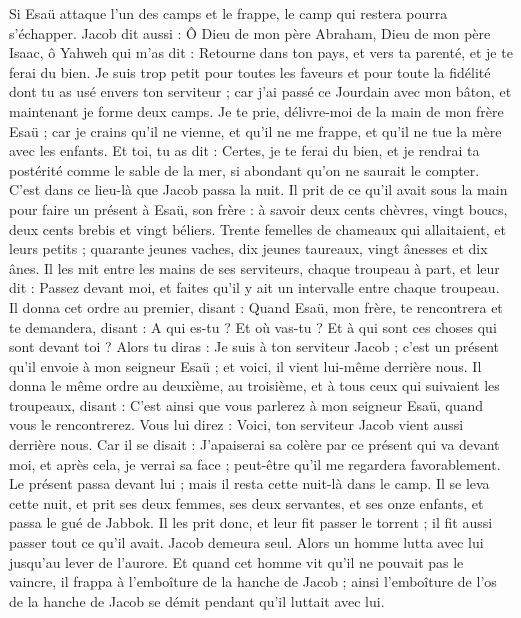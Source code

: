 \begin{multicols}{2}
Si Esaü attaque l'un des camps et le frappe, le camp qui restera pourra s’échapper.
Jacob dit aussi : Ô Dieu de mon père Abraham, Dieu de mon père Isaac, ô Yahweh qui m'as dit : Retourne dans ton pays, et vers ta parenté, et je te ferai du bien.
Je suis trop petit pour toutes les faveurs et pour toute la fidélité dont tu as usé envers ton serviteur ; car j'ai passé ce Jourdain avec mon bâton, et maintenant je forme deux camps.
Je te prie, délivre-moi de la main de mon frère Esaü ; car je crains qu'il ne vienne, et qu'il ne me frappe, et qu'il ne tue la mère avec les enfants.
Et toi, tu as dit : Certes, je te ferai du bien, et je rendrai ta postérité comme le sable de la mer, si abondant qu’on ne saurait le compter.
C’est dans ce lieu-là que Jacob passa la nuit.  Il prit de ce qu’il avait sous la main pour faire un présent à Esaü, son frère :
à savoir deux cents chèvres, vingt boucs, deux cents brebis et vingt béliers.
Trente femelles de chameaux qui allaitaient, et leurs petits ; quarante jeunes vaches, dix jeunes taureaux, vingt ânesses et dix ânes.
Il les mit entre les mains de ses serviteurs, chaque troupeau à part, et leur dit : Passez devant moi, et faites qu'il y ait un intervalle entre chaque troupeau.
Il donna cet ordre au premier, disant : Quand Esaü, mon frère, te rencontrera et te demandera, disant : A qui es-tu ? Et où vas-tu ? Et à qui sont ces choses qui sont devant toi ?
Alors tu diras : Je suis à ton serviteur Jacob ; c'est un présent qu'il envoie à mon seigneur Esaü ; et voici, il vient lui-même derrière nous.
Il donna le même ordre au deuxième, au troisième, et à tous ceux qui suivaient les troupeaux, disant : C’est ainsi que vous parlerez à mon seigneur Esaü, quand vous le rencontrerez.
Vous lui direz : Voici, ton serviteur Jacob vient aussi derrière nous. Car il se disait : J'apaiserai sa colère par ce présent qui va devant moi, et après cela, je verrai sa face ; peut-être qu'il me regardera favorablement.
Le présent passa devant lui ; mais il resta cette nuit-là dans le camp.
Il se leva cette nuit, et prit ses deux femmes, ses deux servantes, et ses onze enfants, et passa le gué de Jabbok.
Il les prit donc, et leur fit passer le torrent ; il fit aussi passer tout ce qu'il avait.
Jacob demeura seul. Alors un homme lutta avec lui jusqu'au lever de l’aurore.
Et quand cet homme vit qu'il ne pouvait pas le vaincre, il frappa à l'emboîture de la hanche de Jacob ; ainsi l'emboîture de l'os de la hanche de Jacob se démit pendant qu’il luttait avec lui.

\end{multicols}

